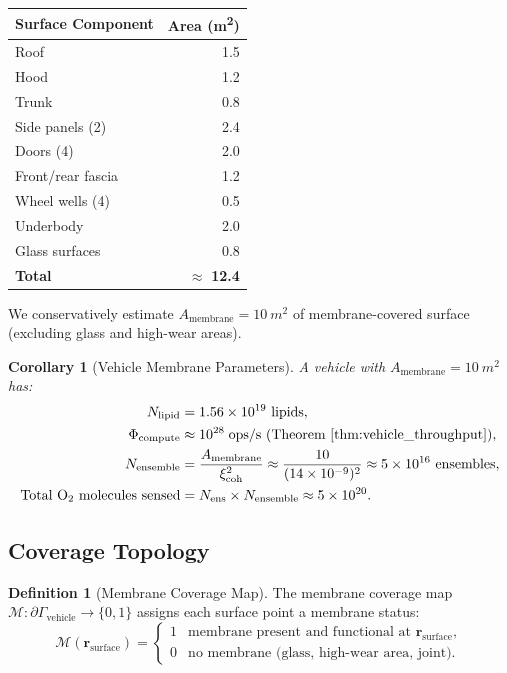 \documentclass[twocolumn,10pt]{article}
\newtheorem{corollary}[theorem]{Corollary}
\theoremstyle{definition}
\newtheorem{definition}[theorem]{Definition}
\theoremstyle{remark}
\newcommand{\xicoh}{\xi_{\mathrm{coh}}}
\newcommand{\Nens}{N_{\mathrm{ens}}}
\begin{document}
\begin{center}
\begin{tabular}{@{}lr@{}}
\toprule
\textbf{Surface Component} & \textbf{Area (\si{m^2})} \\
\midrule
Roof & 1.5 \\
Hood & 1.2 \\
Trunk & 0.8 \\
Side panels (2) & 2.4 \\
Doors (4) & 2.0 \\
Front/rear fascia & 1.2 \\
Wheel wells (4) & 0.5 \\
Underbody & 2.0 \\
Glass surfaces & 0.8 \\
\midrule
\textbf{Total} & $\approx$ \textbf{12.4} \\
\bottomrule
\end{tabular}
\end{center}

We conservatively estimate $A_{\mathrm{membrane}} = \SI{10}{m^2}$ of membrane-covered surface (excluding glass and high-wear areas).

\begin{corollary}[Vehicle Membrane Parameters]
\label{cor:vehicle_params}
A vehicle with $A_{\mathrm{membrane}} = \SI{10}{m^2}$ has:
\begin{align}
  N_{\mathrm{lipid}} &= 1.56 \times 10^{19} \text{ lipids}, \label{eq:vehicle_lipids} \\
  \Phi_{\mathrm{compute}} &\approx 10^{28}\;\text{ops/s (Theorem~\ref{thm:vehicle_throughput})}, \label{eq:vehicle_compute} \\
  N_{\mathrm{ensemble}} &= \frac{A_{\mathrm{membrane}}}{\xicoh^2} \approx \frac{10}{(14 \times 10^{-9})^2} \approx 5 \times 10^{16} \text{ ensembles}, \label{eq:vehicle_ensembles} \\
  \text{Total }  \mathrm{O}_2 \text{ molecules sensed} &= \Nens \times N_{\mathrm{ensemble}} \approx 5 \times 10^{20}. \label{eq:vehicle_o2}
\end{align}
\end{corollary}

\subsection{Coverage Topology}

\begin{definition}[Membrane Coverage Map]
\label{def:coverage}
The membrane coverage map $\mathcal{M}: \partial\Gamma_{\mathrm{vehicle}} \to \{0, 1\}$ assigns each surface point a membrane status:
\begin{equation}
  \mathcal{M}(\mathbf{r}_{\mathrm{surface}}) =
  \begin{cases}
    1 & \text{membrane present and functional at } \mathbf{r}_{\mathrm{surface}}, \\
    0 & \text{no membrane (glass, high-wear area, joint)}.
  \end{cases}
  \label{eq:coverage}
\end{equation}
\end{definition}
\end{document}
